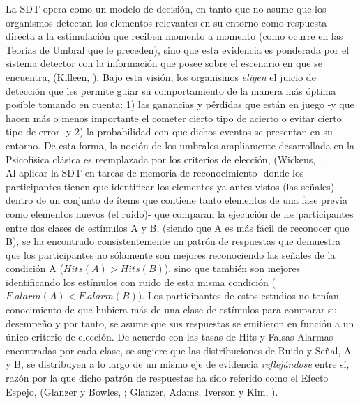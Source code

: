 La SDT opera como un modelo de decisión, en tanto que no asume que los organismos detectan los elementos relevantes en su entorno como respuesta directa a la estimulación que reciben momento a momento (como ocurre en las Teorías de Umbral que le preceden), sino que esta evidencia es ponderada por el sistema detector con la información que posee sobre el escenario en que se encuentra, (Killeen, \citeyear{Killeen2014}). Bajo esta visión, los organismos \textit{eligen} el juicio de detección que les permite guiar su comportamiento de la manera más óptima posible tomando en cuenta: 1) las ganancias y pérdidas que están en juego -y que hacen más o menos importante el cometer cierto tipo de acierto o evitar cierto tipo de error- y 2) la probabilidad con que dichos eventos se presentan en su entorno. De esta forma, la noción de los umbrales ampliamente desarrollada en la Psicofísica clásica es reemplazada por los criterios de elección, (Wickens, \citeyear{Wickens1}.\\ 

Al aplicar la SDT en tareas de memoria de reconocimiento -donde los participantes tienen que identificar los elementos ya antes vistos (las señales) dentro de un conjunto de ítems que contiene tanto elementos de una fase previa como elementos nuevos (el ruido)- que comparan la ejecución de los participantes entre dos clases de estímulos A y B, (siendo que A es más fácil de reconocer que B), se ha encontrado consistentemente un patrón de respuestas que demuestra que los participantes no sólamente son mejores reconociendo las señales de la condición A ($Hits(A)>Hits(B)$), sino que también son mejores identificando los estímulos con ruido de esta misma condición ($F.alarm(A)<F.alarm(B)$). Los participantes de estos estudios no tenían conocimiento de que hubiera más de una clase de estímulos para comparar su desempeño y por tanto, se asume que sus respuestas se emitieron en función a un único criterio de elección. De acuerdo con las tasas de Hits y Falsas Alarmas encontradas por cada clase, se sugiere que las distribuciones de Ruido y Señal, A y B, se distribuyen a lo largo de un mismo eje de evidencia \textit{reflejándose} entre sí, razón por la que dicho patrón de respuestas ha sido referido como el Efecto Espejo, (Glanzer y Bowles, \citeyear{Glanzer1976}; Glanzer, Adams, Iverson y Kim, \citeyear{Glanzer1993}).\\


